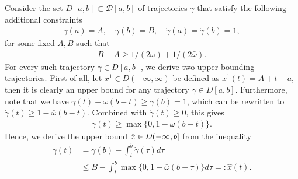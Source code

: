 \documentclass[a4paper]{article}
\theoremstyle{definition}
\theoremstyle{plain}
\begin{document}
Consider the set $D[a,b] \subset \mathcal{D}[a, b]$ of trajectories
$\gamma$ that satisfy the following additional constraints
\begin{align}
  \gamma(a) = A, \quad \gamma(b) = B, \quad \dot{\gamma}(a) = \dot{\gamma}(b) = 1 ,
\end{align}
for some fixed $A, B$ such that
\begin{align}\label{eq:AB-assumption}
  B - A \geq 1/(2\omega) + 1/(2\bar{\omega}).
\end{align}
%
For every such trajectory $\gamma \in D[a,b]$, we derive two upper bounding
trajectories.
%
First of all, let $x^{1} \in D(-\infty, \infty)$ be defined as
$x^{1}(t) = A + t - a$, then it is clearly an upper bound for any trajectory
$\gamma \in D[a, b]$.
%
Furthermore, note that we have $\dot{\gamma}(t) + \bar{\omega} (b - t) \geq \dot{\gamma}(b) = 1$,
which can be rewritten to $\dot{\gamma}(t) \geq 1 - \bar{\omega} (b - t)$. Combined with
$\dot{\gamma}(t) \geq 0$, this gives
\begin{align}
  \dot{\gamma}(t) \geq \max \{ 0, 1 - \bar{\omega}(b - t) \} .
\end{align}
Hence, we derive the upper bound $\hat{x} \in D (-\infty,b]$ from the inequality
\begin{subequations}
\begin{align}
  \gamma(t) &= \gamma(b) - \int_{t}^{b} \dot{\gamma}(\tau) d \tau \\
  &\leq B - \int_{t}^{b} \max\{ 0, 1 -\bar{\omega} (b - \tau) \} d \tau =: \hat{x}(t) .
\end{align}
\end{subequations}
%
\end{document}
